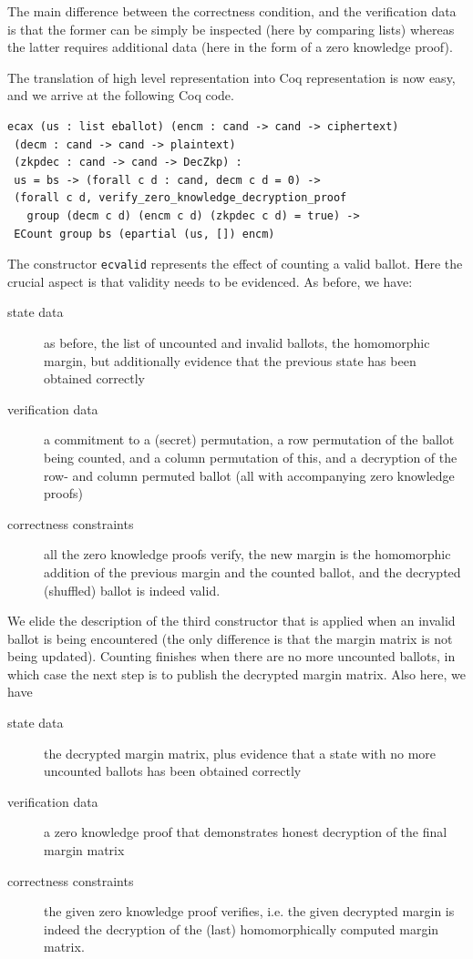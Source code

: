 \noindent
The main difference between the correctness condition, and the
verification data is that the former can be simply be inspected
(here by comparing lists) whereas the latter requires additional
data (here  in the form of a zero knowledge proof).

The translation of high level representation into Coq representation
is now easy, and we arrive at the following Coq code.
\begin{lstlisting}[frame=single,basicstyle=\ttfamily\footnotesize]
ecax (us : list eballot) (encm : cand -> cand -> ciphertext)
 (decm : cand -> cand -> plaintext) 
 (zkpdec : cand -> cand -> DecZkp) :
 us = bs -> (forall c d : cand, decm c d = 0) -> 
 (forall c d, verify_zero_knowledge_decryption_proof 
   group (decm c d) (encm c d) (zkpdec c d) = true) -> 
 ECount group bs (epartial (us, []) encm)
\end{lstlisting}


\noindent
The constructor \texttt{ecvalid} represents the effect of counting a
valid ballot. Here the crucial aspect is that validity needs to be
evidenced. As before, we have:
\begin{description}
  \item[state data] as before, the list of uncounted and invalid
  ballots, the homomorphic margin, but additionally evidence that
  the previous state has been obtained correctly
  \item[verification data]
  a commitment to a (secret) permutation, a row permutation of the
  ballot being counted, and a column permutation of this, and a
  decryption of the row- and column permuted ballot (all with
  accompanying zero knowledge proofs)
  \item[correctness constraints] all the zero knowledge proofs
  verify, the new margin is the homomorphic addition of the previous
  margin and the counted ballot, and the decrypted (shuffled)
  ballot is indeed valid.
\end{description}


\noindent
We elide the description of the third constructor that is applied
when an invalid ballot is being encountered (the only
difference is that the margin matrix is not being updated). 
Counting finishes when there are no more uncounted ballots, in
which case the next step is to publish the decrypted margin matrix.
Also here, we have
\begin{description}
  \item[state data] the decrypted margin matrix, plus evidence
  that a state with no more uncounted ballots has been obtained
  correctly
  \item[verification data] a zero knowledge proof that demonstrates
  honest decryption of the final margin matrix
  \item[correctness constraints] the given zero knowledge proof
  verifies, i.e. the given decrypted margin is indeed the decryption
  of the (last) homomorphically computed margin matrix.
\end{description} 

